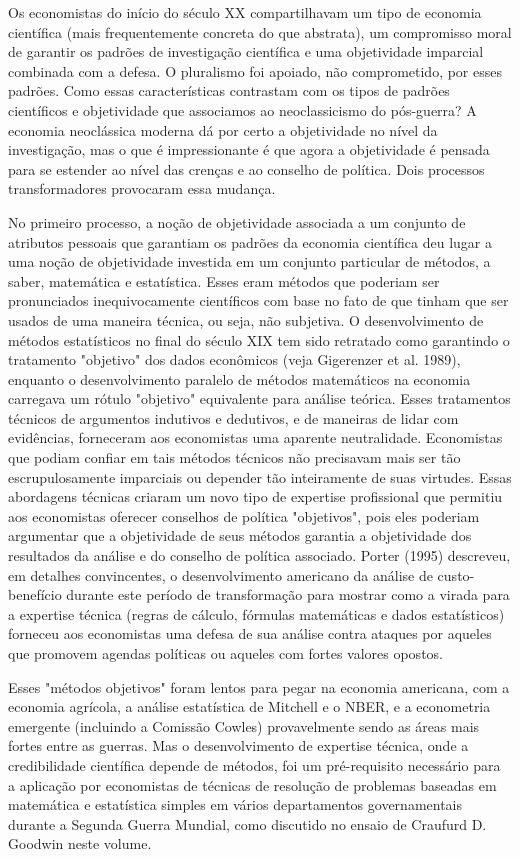 \documentclass[12pt]{article}
\begin{document}
Os economistas do início do século XX compartilhavam um tipo de economia científica (mais frequentemente concreta do que abstrata), um compromisso moral de garantir os padrões de investigação científica e uma objetividade imparcial combinada com a defesa. O pluralismo foi apoiado, não comprometido, por esses padrões. Como essas características contrastam com os tipos de padrões científicos e objetividade que associamos ao neoclassicismo do pós-guerra? A economia neoclássica moderna dá por certo a objetividade no nível da investigação, mas o que é impressionante é que agora a objetividade é pensada para se estender ao nível das crenças e ao conselho de política. Dois processos transformadores provocaram essa mudança.

No primeiro processo, a noção de objetividade associada a um conjunto de atributos pessoais que garantiam os padrões da economia científica deu lugar a uma noção de objetividade investida em um conjunto particular de métodos, a saber, matemática e estatística. Esses eram métodos que poderiam ser pronunciados inequivocamente científicos com base no fato de que tinham que ser usados de uma maneira técnica, ou seja, não subjetiva. O desenvolvimento de métodos estatísticos no final do século XIX tem sido retratado como garantindo o tratamento "objetivo" dos dados econômicos (veja Gigerenzer et al. 1989), enquanto o desenvolvimento paralelo de métodos matemáticos na economia carregava um rótulo "objetivo" equivalente para análise teórica. Esses tratamentos técnicos de argumentos indutivos e dedutivos, e de maneiras de lidar com evidências, forneceram aos economistas uma aparente neutralidade. Economistas que podiam confiar em tais métodos técnicos não precisavam mais ser tão escrupulosamente imparciais ou depender tão inteiramente de suas virtudes. Essas abordagens técnicas criaram um novo tipo de expertise profissional que permitiu aos economistas oferecer conselhos de política "objetivos", pois eles poderiam argumentar que a objetividade de seus métodos garantia a objetividade dos resultados da análise e do conselho de política associado. Porter (1995) descreveu, em detalhes convincentes, o desenvolvimento americano da análise de custo-benefício durante este período de transformação para mostrar como a virada para a expertise técnica (regras de cálculo, fórmulas matemáticas e dados estatísticos) forneceu aos economistas uma defesa de sua análise contra ataques por aqueles que promovem agendas políticas ou aqueles com fortes valores opostos.

Esses "métodos objetivos" foram lentos para pegar na economia americana, com a economia agrícola, a análise estatística de Mitchell e o NBER, e a econometria emergente (incluindo a Comissão Cowles) provavelmente sendo as áreas mais fortes entre as guerras. Mas o desenvolvimento de expertise técnica, onde a credibilidade científica depende de métodos, foi um pré-requisito necessário para a aplicação por economistas de técnicas de resolução de problemas baseadas em matemática e estatística simples em vários departamentos governamentais durante a Segunda Guerra Mundial, como discutido no ensaio de Craufurd D. Goodwin neste volume.
\end{document}

